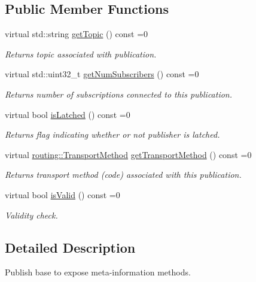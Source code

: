 \subsection*{Public Member Functions}
\begin{DoxyCompactItemize}
\item 
virtual std\+::string \hyperlink{classflow__ros_1_1_publisher_base_aed36dfd3c58ff3c588b2030319cd26e1}{get\+Topic} () const =0
\begin{DoxyCompactList}\small\item\em Returns topic associated with publication. \end{DoxyCompactList}\item 
virtual std\+::uint32\+\_\+t \hyperlink{classflow__ros_1_1_publisher_base_ae5638184ee60bbc1326a5e7b47919bec}{get\+Num\+Subscribers} () const =0
\begin{DoxyCompactList}\small\item\em Returns number of subscriptions connected to this publication. \end{DoxyCompactList}\item 
virtual bool \hyperlink{classflow__ros_1_1_publisher_base_a51ef6d34734d3dc39053234491665d2c}{is\+Latched} () const =0
\begin{DoxyCompactList}\small\item\em Returns flag indicating whether or not publisher is latched. \end{DoxyCompactList}\item 
virtual \hyperlink{transport__info_8h_ae57afcf849a5bdb82b958347c6ccc57b}{routing\+::\+Transport\+Method} \hyperlink{classflow__ros_1_1_publisher_base_ad0cd41b4d2a8e4697610643c7e90d8c7}{get\+Transport\+Method} () const =0
\begin{DoxyCompactList}\small\item\em Returns transport method (code) associated with this publication. \end{DoxyCompactList}\item 
virtual bool \hyperlink{classflow__ros_1_1_publisher_base_ac9bc27703de2394a0e1f3df7dac93548}{is\+Valid} () const =0
\begin{DoxyCompactList}\small\item\em Validity check. \end{DoxyCompactList}\end{DoxyCompactItemize}


\subsection{Detailed Description}
Publish base to expose meta-\/information methods. 

